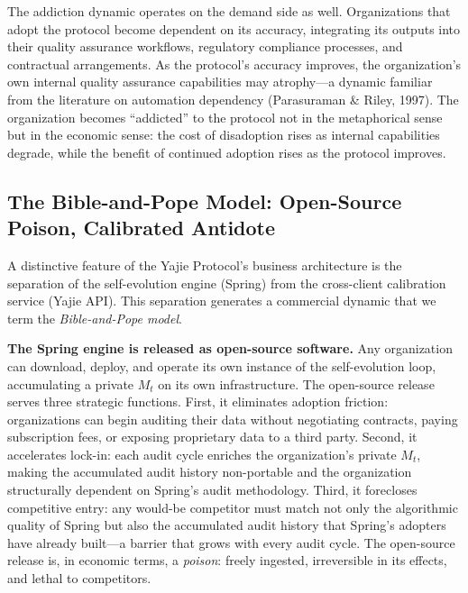 \documentclass[12pt,a4paper]{article}
\theoremstyle{definition}
\theoremstyle{remark}
\begin{document}
The addiction dynamic operates on the demand side as well. Organizations that adopt the protocol become dependent on its accuracy, integrating its outputs into their quality assurance workflows, regulatory compliance processes, and contractual arrangements. As the protocol's accuracy improves, the organization's own internal quality assurance capabilities may atrophy—a dynamic familiar from the literature on automation dependency (Parasuraman \& Riley, 1997). The organization becomes ``addicted'' to the protocol not in the metaphorical sense but in the economic sense: the cost of disadoption rises as internal capabilities degrade, while the benefit of continued adoption rises as the protocol improves.

\subsection{The Bible-and-Pope Model: Open-Source Poison, Calibrated Antidote}

A distinctive feature of the Yajie Protocol's business architecture is the separation of the self-evolution engine (Spring) from the cross-client calibration service (Yajie API). This separation generates a commercial dynamic that we term the \textit{Bible-and-Pope model}.

\textbf{The Spring engine is released as open-source software.} Any organization can download, deploy, and operate its own instance of the self-evolution loop, accumulating a private $M_t$ on its own infrastructure. The open-source release serves three strategic functions. First, it eliminates adoption friction: organizations can begin auditing their data without negotiating contracts, paying subscription fees, or exposing proprietary data to a third party. Second, it accelerates lock-in: each audit cycle enriches the organization's private $M_t$, making the accumulated audit history non-portable and the organization structurally dependent on Spring's audit methodology. Third, it forecloses competitive entry: any would-be competitor must match not only the algorithmic quality of Spring but also the accumulated audit history that Spring's adopters have already built—a barrier that grows with every audit cycle. The open-source release is, in economic terms, a \textit{poison}: freely ingested, irreversible in its effects, and lethal to competitors.
\end{document}
